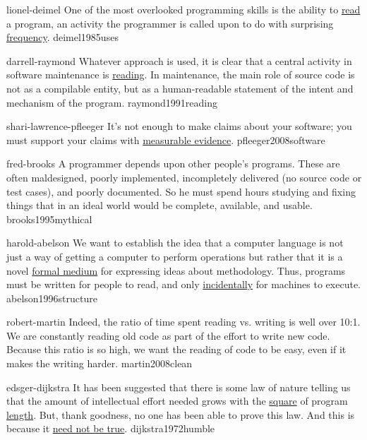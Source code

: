 \documentclass{article}
\begin{document}

\qte
  {lionel-deimel}
  {One of the most overlooked programming skills is the ability to \ul{read} a program, an activity the programmer is called upon to do with surprising \ul{frequency}.}
  {deimel1985uses}

\qte
  {darrell-raymond}
  {Whatever approach is used, it is clear that a central activity in software maintenance is \ul{reading}. In maintenance, the main role of source code is not as a compilable entity, but as a human-readable statement of the intent and mechanism of the program.}
  {raymond1991reading}

\qte
  {shari-lawrence-pfleeger}
  {It's not enough to make claims about your software; you must support your claims with \ul{measurable evidence}.}
  {pfleeger2008software}


\qte
  {fred-brooks}
  {A programmer depends upon other people's programs. These are often maldesigned, poorly implemented, incompletely delivered (no source code or test cases), and poorly documented. So he must spend hours studying and fixing things that in an ideal world would be complete, available, and usable.}
  {brooks1995mythical}


\qte
  {harold-abelson}
  {We want to establish the idea that a computer language is not just a way of getting a computer to perform operations but rather that it is a novel \ul{formal medium} for expressing ideas about methodology. Thus, programs must be written for people to read, and only \ul{incidentally} for machines to execute.}
  {abelson1996structure}

\qte
  {robert-martin}
  {Indeed, the ratio of time spent reading vs. writing is well over 10:1. We are constantly reading old code as part of the effort to write new code. Because this ratio is so high, we want the reading of code to be easy, even if it makes the writing harder.}
  {martin2008clean}


\qte
  {edsger-dijkstra}
  {It has been suggested that there is some law of nature telling us that the amount of intellectual effort needed grows with the \ul{square} of program \ul{length}. But, thank goodness, no one has been able to prove this law. And this is because it \ul{need not be true}.}
  {dijkstra1972humble}
\end{document}
